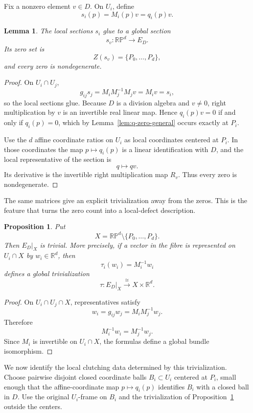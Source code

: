 \documentclass[12pt]{article}
\theoremstyle{plain}
\newtheorem{proposition}[theorem]{Proposition}
\newtheorem{lemma}[theorem]{Lemma}
\theoremstyle{definition}
\newcommand{\R}{\mathbb R}
\newcommand{\RP}{\mathbb{RP}}
\begin{document}
Fix a nonzero element $v\in D$. On $U_i$, define
\[ s_i(p)=M_i(p)v=q_i(p)v.
\]

\begin{lemma}
	\label{lem:general-section}
	The local sections $s_i$ glue to a global section
	\[
	s_v:\RP^d\longrightarrow E_D.
	\]
	Its zero set is
	\[
	Z(s_v)=\{P_0,\ldots,P_d\},
	\]
	and every zero is nondegenerate.
\end{lemma}

\begin{proof}
	On $U_i\cap U_j$,
	\[
	g_{ij}s_j
	=M_iM_j^{-1}M_jv
	=M_iv=s_i,
	\]
	so the local sections glue. Because $D$ is a division algebra and $v\ne0$, right multiplication by $v$ is an invertible real linear map. Hence $q_i(p)v=0$ if and only if $q_i(p)=0$, which by Lemma~\ref{lem:q-zero-general} occurs exactly at
	$P_i$.
	
	Use the $d$ affine coordinate ratios on $U_i$ as local coordinates
	centered at $P_i$. In those coordinates the map $p\mapsto q_i(p)$ is
	a linear identification with $D$, and the local representative of the
	section is
	\[
	q\longmapsto qv.
	\]
	Its derivative is the invertible right multiplication map $R_v$.
	Thus every zero is nondegenerate.
\end{proof}

The same matrices give an explicit trivialization away from the zeros.
This is the feature that turns the zero count into a local-defect
description.

\begin{proposition}
	\label{prop:punctured-trivialization}
	Put
	\[
	X=\RP^d\setminus\{P_0,\ldots,P_d\}.
	\]
	Then $E_D|_X$ is trivial. More precisely, if a vector in the fibre is
	represented on $U_i\cap X$ by $w_i\in\R^d$, then
	\[
	\tau_i(w_i)=M_i^{-1}w_i
	\]
	defines a global trivialization
	\[
	\tau:E_D|_X\xrightarrow{\ \cong\ }X\times\R^d.
	\]
\end{proposition}

\begin{proof}
	On $U_i\cap U_j\cap X$, representatives satisfy
	\[
	w_i=g_{ij}w_j=M_iM_j^{-1}w_j.
	\]
	Therefore
	\[
	M_i^{-1}w_i=M_j^{-1}w_j.
	\]
	Since $M_i$ is invertible on $U_i\cap X$, the formulas define a global
	bundle isomorphism.
\end{proof}

We now identify the local clutching data determined by this
trivialization. Choose pairwise disjoint closed coordinate balls $B_i\subset U_i $ centered at $P_i$, small enough that the affine-coordinate map
$p\mapsto q_i(p)$ identifies $B_i$ with a closed ball in $D$. Use the
original $U_i$-frame on $B_i$ and the trivialization
of Proposition~\ref{prop:punctured-trivialization} outside the centers.
\end{document}

